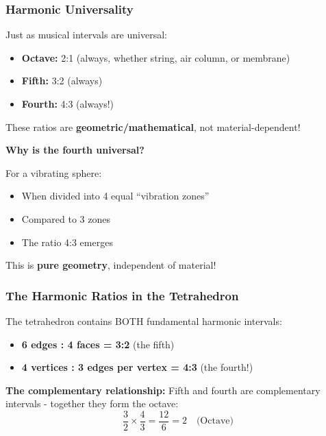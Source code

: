 \documentclass[12pt,a4paper]{article}
\begin{document}
			\subsubsection{Harmonic Universality}
			\label{subsubsec:harmonic_universality}
			
			Just as musical intervals are universal:
			\begin{itemize}
				\item \textbf{Octave:} 2:1 (always, whether string, air column, or membrane)
				\item \textbf{Fifth:} 3:2 (always)
				\item \textbf{Fourth:} 4:3 (always!)
			\end{itemize}
			
			These ratios are \textbf{geometric/mathematical}, not material-dependent!
			
			\textbf{Why is the fourth universal?}
			
			For a vibrating sphere:
			\begin{itemize}
				\item When divided into 4 equal ``vibration zones''
				\item Compared to 3 zones
				\item The ratio 4:3 emerges
			\end{itemize}
			
			This is \textbf{pure geometry}, independent of material!
			
			\subsubsection{The Harmonic Ratios in the Tetrahedron}
			\label{subsubsec:tetrahedron_harmonics}
			
			The tetrahedron contains BOTH fundamental harmonic intervals:
			\begin{itemize}
				\item \textbf{6 edges : 4 faces = 3:2} (the fifth)
				\item \textbf{4 vertices : 3 edges per vertex = 4:3} (the fourth!)
			\end{itemize}
			
			\textbf{The complementary relationship:}
			Fifth and fourth are complementary intervals - together they form the octave:
			\begin{equation}
				\frac{3}{2} \times \frac{4}{3} = \frac{12}{6} = 2 \quad \text{(Octave)}
			\end{equation}
			
\end{document}

